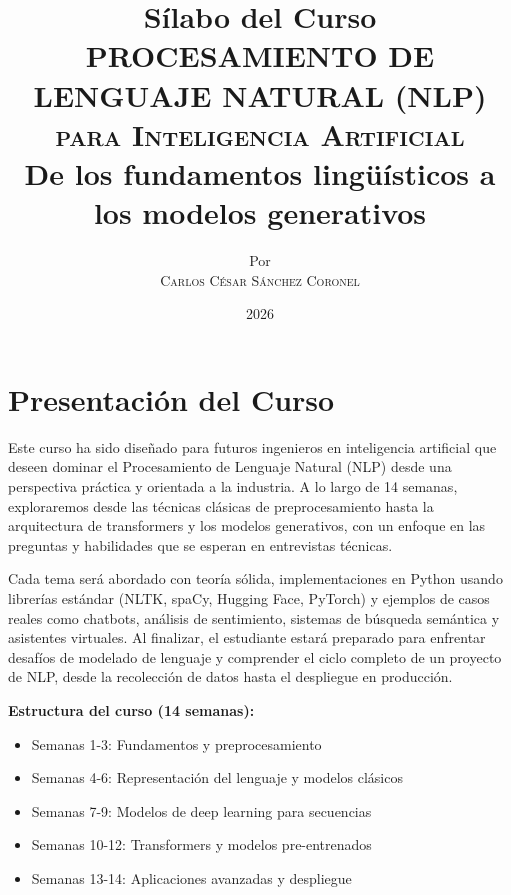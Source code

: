\documentclass[12pt,a4paper,openany,oneside]{book}
\title{
    \textbf{Sílabo del Curso} \\ 
    \Huge \textbf{PROCESAMIENTO DE LENGUAJE NATURAL (NLP)} \\
    \Large \textsc{para Inteligencia Artificial} \\[1cm]
    \normalsize De los fundamentos lingüísticos a los modelos generativos
}
\author{
    \small Por \\ \vspace{0.2cm}
    \Large \textsc{Carlos César Sánchez Coronel}
}
\date{2026}
\begin{document}
\maketitle
\tableofcontents

\chapter*{Presentación del Curso}

Este curso ha sido diseñado para futuros ingenieros en inteligencia artificial que deseen dominar el Procesamiento de Lenguaje Natural (NLP) desde una perspectiva práctica y orientada a la industria. A lo largo de 14 semanas, exploraremos desde las técnicas clásicas de preprocesamiento hasta la arquitectura de transformers y los modelos generativos, con un enfoque en las preguntas y habilidades que se esperan en entrevistas técnicas.

Cada tema será abordado con teoría sólida, implementaciones en Python usando librerías estándar (NLTK, spaCy, Hugging Face, PyTorch) y ejemplos de casos reales como chatbots, análisis de sentimiento, sistemas de búsqueda semántica y asistentes virtuales. Al finalizar, el estudiante estará preparado para enfrentar desafíos de modelado de lenguaje y comprender el ciclo completo de un proyecto de NLP, desde la recolección de datos hasta el despliegue en producción.

\vspace{0.5cm}
\textbf{Estructura del curso (14 semanas):}
\begin{itemize}
    \item[$\square$] Semanas 1-3: Fundamentos y preprocesamiento
    \item[$\square$] Semanas 4-6: Representación del lenguaje y modelos clásicos
    \item[$\square$] Semanas 7-9: Modelos de deep learning para secuencias
    \item[$\square$] Semanas 10-12: Transformers y modelos pre-entrenados
    \item[$\square$] Semanas 13-14: Aplicaciones avanzadas y despliegue
\end{itemize}

\end{document}
